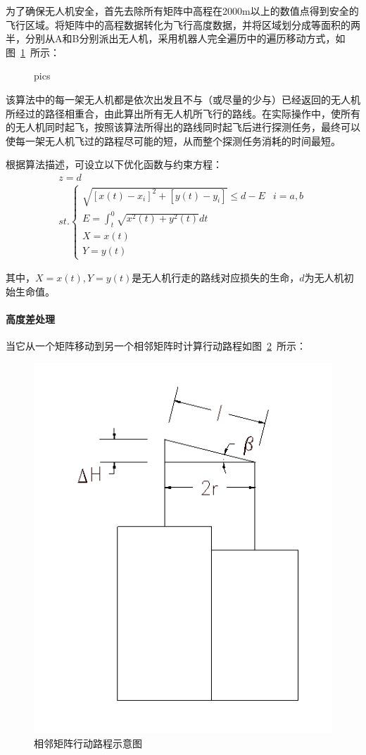 \documentclass{whutmod}
\begin{document}
	为了确保无人机安全，首先去除所有矩阵中高程在2000m以上的数值点得到安全的飞行区域。将矩阵中的高程数据转化为飞行高度数据，并将区域划分成等面积的两半，分别从A和B分别派出无人机\parencite{田春颖2004基于栅格地图的移动机器人完全遍历算法}，采用机器人完全遍历中的遍历移动方式，如图~\ref{qq}~所示：


	\begin{figure}[H]
		\centering
		\quad
		\quad
		\quad
		\caption{ pics}\label{qq}
	\end{figure}
	
	该算法中的每一架无人机都是依次出发且不与（或尽量的少与）已经返回的无人机所经过的路径相重合，由此算出所有无人机所飞行的路线。在实际操作中，使所有的无人机同时起飞，按照该算法所得出的路线同时起飞后进行探测任务，最终可以使每一架无人机飞过的路程尽可能的短，从而整个探测任务消耗的时间最短。

	根据算法描述，可设立以下优化函数与约束方程：
	\begin{gather}
		z=d \\
		st. \left\{\begin{matrix}
		\sqrt{[x(t)-x_{i}]^{2}+[y(t)-y_{i}]} \leqslant d-E& i=a,b\\
		E=\int_{t}^{0} \sqrt{x^{2}(t)+y^{2}(t)}dt\\ 
		X=x(t)& \\ 
		Y=y(t)& 
		\end{matrix}\right.
	\end{gather}
	
	其中，$X=x(t),Y=y(t)$是无人机行走的路线对应损失的生命，$d$为无人机初始生命值。
	
	
	
	\paragraph{高度差处理}当它从一个矩阵移动到另一个相邻矩阵时计算行动路程如图~\ref{gaodu}~所示：
		\begin{figure}[H]
		\centering
		\includegraphics[width=.5\textwidth]{figures/gaodu.png}
		\caption{相邻矩阵行动路程示意图}\label{gaodu}
	\end{figure}
\end{document}
